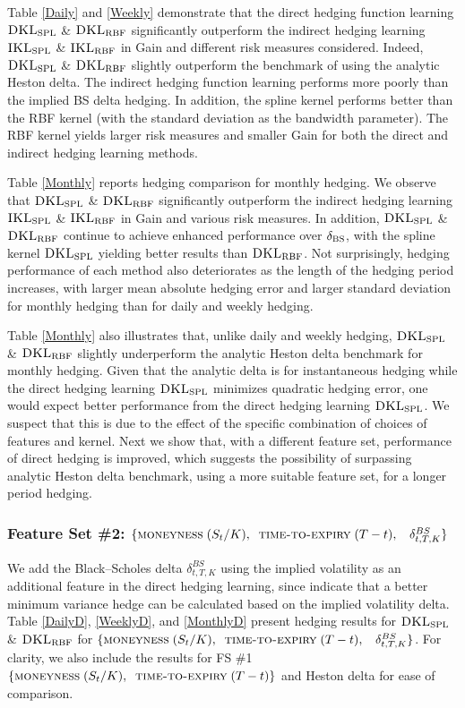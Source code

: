 \documentclass[letterpaper,12pt,titlepage,oneside,final]{book}
\numberwithin{equation}{section}
\theoremstyle{definition}
\newcommand{\DKLs}{\bf\textsc{DKL}_{\text{SPL}}}
\newcommand{\DKLg}{\bf\textsc{DKL}_{\text{RBF}}}
\newcommand{\IKLs}{\bf\textsc{IKL}_{\text{SPL}}}
\newcommand{\IKLg}{\bf\textsc{IKL}_{\text{RBF}}}
\newcommand{\Del}{\delta_{\textsc{BS}}}
\begin{document}
Table \ref{Daily} and \ref{Weekly}  demonstrate that the direct hedging function learning $\DKLs$ \& $\DKLg$  significantly outperform the indirect hedging learning $\IKLs$ \& $\IKLg$ in Gain and different risk measures considered. Indeed, $\DKLs$ \& $\DKLg$ slightly outperform the benchmark of using the analytic Heston delta.
The indirect hedging function learning performs more poorly than the implied BS delta hedging. In addition,  the spline kernel performs better than the RBF kernel (with the standard deviation as the bandwidth parameter). The RBF kernel yields larger risk measures and smaller Gain  for both the direct and indirect hedging learning methods.

Table \ref{Monthly} reports hedging comparison for monthly hedging. We  observe that  $\DKLs$ \& $\DKLg$  significantly outperform the indirect hedging learning $\IKLs$ \& $\IKLg$ in  Gain and various risk measures. In addition, $\DKLs$ \& $\DKLg$ continue to achieve enhanced performance over $\Del$, with the spline kernel $\DKLs$ yielding better results than $\DKLg$.
Not surprisingly, hedging performance of each method also deteriorates as the length of the hedging period increases,  with larger mean absolute hedging error and larger standard deviation for monthly hedging than for daily and weekly hedging.

Table \ref{Monthly} also illustrates that, unlike daily and weekly hedging, $\DKLs$ \& $\DKLg$ slightly underperform the analytic Heston delta benchmark  for monthly hedging.
Given that the analytic delta is for instantaneous hedging while the direct hedging learning $\DKLs$ minimizes quadratic hedging error, one would expect better performance from the direct hedging learning $\DKLs$. We suspect that this is due to the effect of the specific combination of choices of features and kernel. Next we show that,  with a different feature set,   performance of direct hedging is improved, which suggests the possibility of surpassing  analytic Heston delta benchmark, using a more suitable feature set, for a longer period hedging.


\subsubsection{Feature Set \#2: $ \{\textsc{moneyness} \;(S_t/K),\;\;\textsc{time-to-expiry} \;(T-t) ,\;\;~ \delta^{BS}_{t,T,K}\}$}
We add the Black–Scholes delta $\delta^{BS}_{t,T,K}$ using the implied volatility as an additional feature in the direct hedging learning, since \citet{hulloptimal} indicate that a better minimum  variance hedge can be calculated based on the implied volatility delta.  Table \ref{DailyD}, \ref{WeeklyD}, and \ref{MonthlyD}
present hedging results for  $\DKLs$ \& $\DKLg$ for  $\{\textsc{moneyness} \;(S_t/K),\;\;\textsc{time-to-expiry} \;(T-t) ,\;\;~ \delta^{BS}_{t,T,K}\}$. For clarity, we also include the results for FS \#1 $\{\textsc{moneyness} \;(S_t/K),\;\;\textsc{time-to-expiry} \;(T-t) \}$ and Heston delta for ease of comparison.
\end{document}

